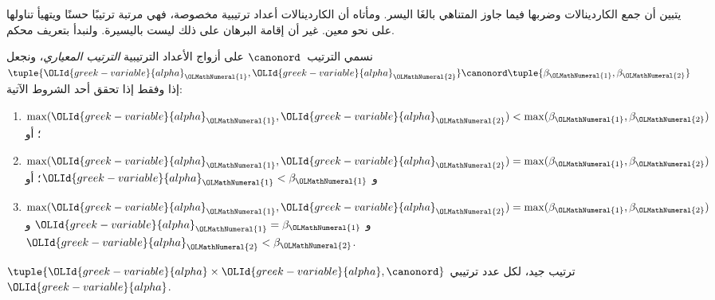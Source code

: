 \documentclass[../../../include/open-logic-section]{subfiles}
\begin{document}


يتبين أن جمع الكاردينالات وضربها فيما جاوز المتناهي بالغَا اليسر.
ومأتاه أن الكاردينالات أعداد ترتيبية مخصوصة، فهي مرتبة ترتيبًا حسنًا
ويتهيأ تناولها على نحو معين. غير أن إقامة البرهان على ذلك ليست باليسيرة.
ولنبدأ بتعريف محكم.

\begin{defn}
نسمي الترتيب~$\canonord$ على أزواج الأعداد الترتيبية
\emph{الترتيب المعياري}، ونجعل
$\tuple{\OLId{greek-variable}{alpha}_\OLMathNumeral{1}, \OLId{greek-variable}{alpha}_\OLMathNumeral{2}} \canonord
\tuple{\beta_\OLMathNumeral{1}, \beta_\OLMathNumeral{2}}$ إذا وفقط إذا تحقق أحد الشروط الآتية:
\begin{enumerate}
	\item $\max(\OLId{greek-variable}{alpha}_\OLMathNumeral{1}, \OLId{greek-variable}{alpha}_\OLMathNumeral{2}) < \max(\beta_\OLMathNumeral{1}, \beta_\OLMathNumeral{2})$؛ أو
	\item $\max(\OLId{greek-variable}{alpha}_\OLMathNumeral{1}, \OLId{greek-variable}{alpha}_\OLMathNumeral{2}) = \max(\beta_\OLMathNumeral{1}, \beta_\OLMathNumeral{2})$ و
	$\OLId{greek-variable}{alpha}_\OLMathNumeral{1} < \beta_\OLMathNumeral{1}$؛ أو
	\item $\max(\OLId{greek-variable}{alpha}_\OLMathNumeral{1}, \OLId{greek-variable}{alpha}_\OLMathNumeral{2}) = \max(\beta_\OLMathNumeral{1}, \beta_\OLMathNumeral{2})$ و
	$\OLId{greek-variable}{alpha}_\OLMathNumeral{1} = \beta_\OLMathNumeral{1}$ و$\OLId{greek-variable}{alpha}_\OLMathNumeral{2} < \beta_\OLMathNumeral{2}$.
\end{enumerate}
\end{defn}

\begin{lem}
$\tuple{\OLId{greek-variable}{alpha} \times \OLId{greek-variable}{alpha}, \canonord}$ ترتيب جيد، لكل عدد ترتيبي
$\OLId{greek-variable}{alpha}$.
\end{lem}
\end{document}
